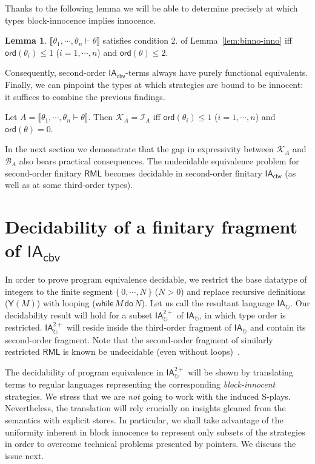 \documentclass{CSML}
\theoremstyle{definition}\newtheorem{definition}[thm]{Definition}
\theoremstyle{definition}\newtheorem{example}[thm]{Example}
\theoremstyle{definition}\newtheorem{proposition}[thm]{Proposition}
\theoremstyle{definition}\newtheorem{lemma}[thm]{Lemma}
\theoremstyle{definition}\newtheorem{theorem}[thm]{Theorem}
\theoremstyle{definition}\newtheorem{corollary}[thm]{Corollary}
\theoremstyle{definition}\newtheorem{remark}[thm]{Remark}
\newcommand\ialoop{\mathsf{IA}_{\circlearrowright}}
\newcommand\iatwo{\ialoop^{2+}}
\newcommand\iacbv{\mathsf{IA}_{\mathsf{cbv}}}
\newcommand\rml{\mathsf{RML}}
\newcommand\fix[1]{\mathsf{Y}(#1)}
\newcommand\while[2]{\mathsf{while}\,#1\,\mathsf{do}\,#2}
\newcommand\makeset[1]{\{\,#1\,\}}
\newcommand\sem[1]{\llbracket #1 \rrbracket}
\newcommand\seq[2]{{#1} \vdash {#2}}
\newcommand\knowing[1]{\mathcal{K}_{#1}}
\newcommand\binno[1]{\mathcal{B}_{#1}}
\newcommand\inno[1]{\mathcal{I}_{#1}}
\newcommand\ord[1]{\mathsf{ord}(#1)}
\begin{document}
\noindent Thanks to the following lemma we will be able to determine precisely at which 
types  block-innocence implies innocence.
\begin{lemma}
$\sem{\seq{\theta_1,\cdots,\theta_n}{\theta}}$ satisfies condition 2.
of Lemma~\ref{lem:binno-inno} iff $\ord{\theta_i}\le 1$ ($i=1,\cdots,n$)
and $\ord{\theta}\le 2$.
\end{lemma}
Consequently, second-order $\iacbv$-terms always have
purely functional equivalents.
Finally, we can pinpoint the types at which strategies are bound to be innocent:
it suffices to combine the previous findings.
\begin{thm}
Let $A=\sem{\seq{\theta_1,\cdots,\theta_n}{\theta}}$. Then 
$\knowing{A}=\inno{A}$ iff $\ord{\theta_i}\le 1$ ($i=1,\cdots,n$) and $\ord{\theta}=0$.
\end{thm}
In the next section we demonstrate that the gap in expressivity between $\knowing{A}$
and $\binno{A}$ also bears practical consequences.  The undecidable equivalence
problem for second-order finitary $\rml$ becomes decidable in second-order finitary $\iacbv$
(as well as at some third-order types).





\section{Decidability of a finitary fragment of \texorpdfstring{$\iacbv$}{IAcbv}}

In order to prove program equivalence decidable, we restrict the base
datatype of integers to the finite segment $\makeset{0,\cdots,N}$ ($N>0$)
and replace recursive definitions ($\fix{M}$) with looping ($\while{M}{N}$).
Let us call the resultant language $\ialoop$.
Our decidability result will hold for a subset $\iatwo$ of $\ialoop$, in which
type order is restricted. $\iatwo$ will reside inside the third-order fragment of $\ialoop$
and contain its second-order fragment. Note that the second-order fragment of 
similarly restricted $\rml$ is known be undecidable (even without loops)~\cite{Mur04b}.

The decidability of program equivalence in $\iatwo$ will be shown by translating terms
to regular languages representing the corresponding \emph{block-innocent} strategies.
We stress that we are \emph{not} going to work with the induced S-plays.
Nevertheless, the translation will rely crucially on insights
gleaned from the semantics with explicit stores. In particular, we shall take advantage of the uniformity inherent in block innocence
to represent only subsets of the strategies in order to overcome technical problems presented by pointers.
We discuss the issue next.
\end{document}
